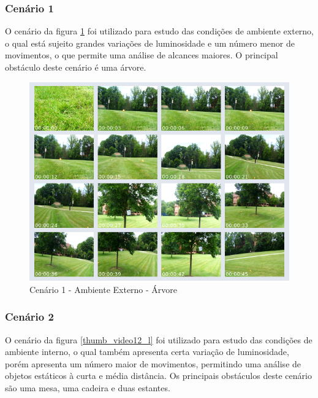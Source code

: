 \subsubsection{Cenário 1}

O cenário da figura \ref{thumb_video10_l} foi utilizado para estudo das condições de ambiente externo, o qual está sujeito grandes variações de luminosidade e um número menor de movimentos, o que permite uma análise de alcances maiores. O principal  obstáculo deste cenário é uma árvore. 

\begin{figure}[H]
	\centering
	\includegraphics[scale=0.50]{./Resources/thumb_video10_l.png}
	\caption{Cenário 1 - Ambiente Externo - Árvore}
	\label{thumb_video10_l}
\end{figure}


\subsubsection{Cenário 2}

O cenário da figura \ref{thumb_video12_l} foi utilizado para estudo das condições de ambiente interno, o qual também apresenta certa variação de luminosidade, porém apresenta um número maior de movimentos, permitindo uma análise de objetos estáticos à curta e média distância. Os principais obstáculos deste cenário são uma mesa, uma cadeira e duas estantes.


